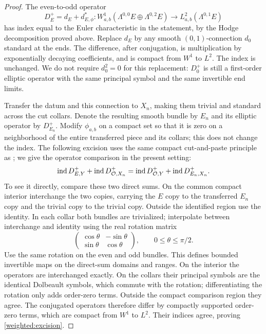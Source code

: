\begin{proof}
The even-to-odd operator
\[
 D_E^+=d_E+d_{E,\phi}^*:
 W^1_{a,b}(\Lambda^{0,0}E\oplus\Lambda^{0,2}E)
 \longrightarrow L^2_{a,b}(\Lambda^{0,1}E)
\]
has index equal to the Euler characteristic in the statement, by the
Hodge decomposition proved above. Replace $d_E$ by any smooth
$(0,1)$-connection $d_0$ standard at the ends. The difference, after
conjugation, is multiplication by exponentially decaying coefficients,
and is compact from $W^1$ to $L^2$. The index is unchanged. We do not
require $d_0^2=0$ for this replacement: $D_0^+$ is still a first-order
elliptic operator with the same principal symbol and the same invertible
end limits.

Transfer the datum and this connection to $X_n$, making them trivial and
standard across the cut collars. Denote the resulting smooth bundle
by $E_n$ and its elliptic operator by $D_{E_n}^+$. Modify
$\phi_{a,b}$ on a compact set so that it is zero on a neighborhood of
the entire transferred piece and its collars; this does not change
the index. The following excision uses the same compact cut-and-paste
principle as \cite[Proposition~3.1]{MRS2014}; we give the operator
comparison in the present setting:
\begin{equation}\label{weighted:excision}
 \operatorname{ind} D_{E,Y}^++\operatorname{ind} D_{\mathcal O,X_n}^+
 =\operatorname{ind} D_{\mathcal O,Y}^++\operatorname{ind} D_{E_n,X_n}^+.
\end{equation}
To see it directly, compare these two direct sums. On the common
compact interior interchange the two copies, carrying the $E$ copy
to the transferred $E_n$ copy and the trivial copy to the trivial copy.
Outside the identified region use the identity. In each collar both
bundles are trivialized; interpolate between interchange and identity
using the real rotation matrix
\[
 \begin{pmatrix}\cos\theta&-\sin\theta\\
                 \sin\theta&\cos\theta\end{pmatrix},
 \qquad 0\le\theta\le\pi/2.
\]
Use the same rotation on the even and odd bundles. This defines bounded
invertible maps on the direct-sum domains and ranges. On the interior
the operators are interchanged exactly. On the collars their principal
symbols are the identical Dolbeault symbols, which commute with the
rotation; differentiating the rotation only adds order-zero terms.
Outside the compact comparison region they agree. The conjugated
operators therefore differ by compactly supported order-zero terms,
which are compact from $W^1$ to $L^2$. Their indices agree, proving
\eqref{weighted:excision}.


\end{proof}
